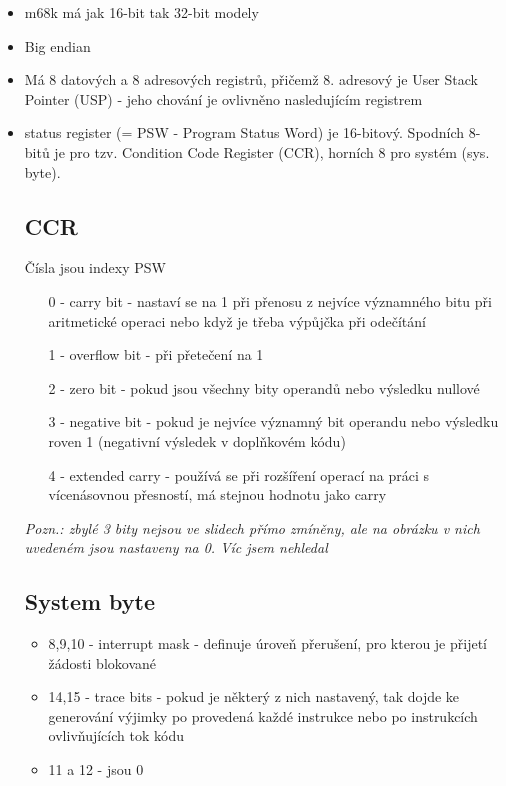 \documentclass[10pt,a4paper,openright]{article}
\begin{document}
\begin{itemize}
\item m68k má jak 16-bit tak 32-bit modely
\item Big endian
\item Má 8 datových a 8 adresových registrů, přičemž 8. adresový je User Stack Pointer (USP) - jeho chování je ovlivněno nasledujícím registrem
\item status register (= PSW - Program Status Word) je 16-bitový. Spodních 8-bitů je pro tzv. Condition Code Register (CCR), horních 8 pro systém (sys. byte).

\subsection{CCR}
Čísla jsou indexy PSW
\begin{itemize}
	\item[0] - carry bit - nastaví se na 1 při přenosu z nejvíce významného bitu při aritmetické operaci nebo když je třeba výpůjčka při odečítání
	\item[1] - overflow bit - při přetečení na 1
	\item[2] - zero bit - pokud jsou všechny bity operandů nebo výsledku nullové
	\item[3] - negative bit - pokud je nejvíce významný bit operandu nebo výsledku roven 1 (negativní výsledek v doplňkovém kódu)
	\item[4] - extended carry - používá se při rozšíření operací na práci s vícenásovnou přesností, má stejnou hodnotu jako carry
	\end{itemize}
	\textit{Pozn.: zbylé 3 bity nejsou ve slidech přímo zmíněny, ale na obrázku v nich uvedeném jsou nastaveny na 0. Víc jsem nehledal}
	
\subsection{System byte}
	\begin{itemize}
	\item 8,9,10 - interrupt mask - definuje úroveň přerušení, pro kterou je přijetí žádosti blokované
	\item 14,15 - trace bits - pokud je některý z nich nastavený, tak dojde ke generování výjimky po provedená každé instrukce nebo po instrukcích ovlivňujících tok kódu
	\item 11 a 12 - jsou 0
	\end{itemize}
\end{itemize}
\end{document}
